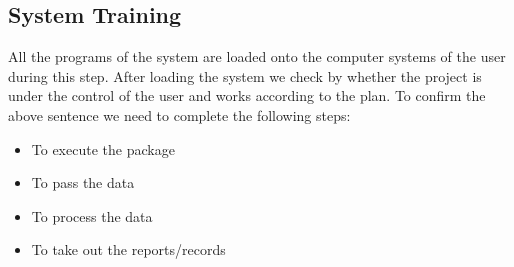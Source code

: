 		\subsection{System Training}
		\hspace{1cm}All the programs of the system are loaded onto the computer systems of the user during this step. After loading the system we check by whether the project is under the control of the user and works according to the plan. To confirm the above sentence we need to complete the following steps: 
		\begin{itemize}
			\item To execute the package
			\item To pass the data
			\item To process the data
			\item To take out the reports/records
		\end{itemize}
		\pagebreak
